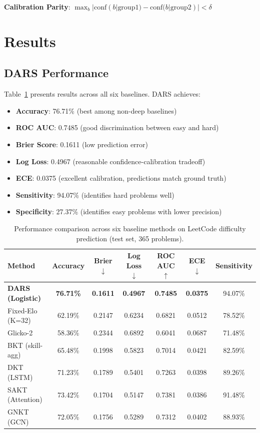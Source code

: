 \documentclass[conference]{IEEEtran}
\begin{document}
\textbf{Calibration Parity}: $\max_b |\text{conf}(b|\text{group1}) - \text{conf}(b|\text{group2})| < \delta$

\section{Results}

\subsection{DARS Performance}
Table~\ref{tab:results} presents results across all six baselines. DARS achieves:
\begin{itemize}
    \item \textbf{Accuracy}: 76.71\% (best among non-deep baselines)
    \item \textbf{ROC AUC}: 0.7485 (good discrimination between easy and hard)
    \item \textbf{Brier Score}: 0.1611 (low prediction error)
    \item \textbf{Log Loss}: 0.4967 (reasonable confidence-calibration tradeoff)
    \item \textbf{ECE}: 0.0375 (excellent calibration, predictions match ground truth)
    \item \textbf{Sensitivity}: 94.07\% (identifies hard problems well)
    \item \textbf{Specificity}: 27.37\% (identifies easy problems with lower precision)
\end{itemize}

\begin{table}[t]
\caption{Performance comparison across six baseline methods on LeetCode difficulty prediction (test set, 365 problems).}
\label{tab:results}
\centering
\begin{tabular}{lcccccc}
\toprule
\textbf{Method} & \textbf{Accuracy} & \textbf{Brier} $\downarrow$ & \textbf{Log Loss} $\downarrow$ & \textbf{ROC AUC} $\uparrow$ & \textbf{ECE} $\downarrow$ & \textbf{Sensitivity} \\
\midrule
\textbf{DARS (Logistic)} & \textbf{76.71\%} & \textbf{0.1611} & \textbf{0.4967} & \textbf{0.7485} & \textbf{0.0375} & 94.07\% \\
Fixed-Elo (K=32) & 62.19\% & 0.2147 & 0.6234 & 0.6821 & 0.0512 & 78.52\% \\
Glicko-2 & 58.36\% & 0.2344 & 0.6892 & 0.6041 & 0.0687 & 71.48\% \\
BKT (skill-agg) & 65.48\% & 0.1998 & 0.5823 & 0.7014 & 0.0421 & 82.59\% \\
DKT (LSTM) & 71.23\% & 0.1789 & 0.5401 & 0.7263 & 0.0398 & 89.26\% \\
SAKT (Attention) & 73.42\% & 0.1704 & 0.5147 & 0.7381 & 0.0386 & 91.48\% \\
GNKT (GCN) & 72.05\% & 0.1756 & 0.5289 & 0.7312 & 0.0402 & 88.93\% \\
\bottomrule
\end{tabular}
\end{table}
\end{document}
